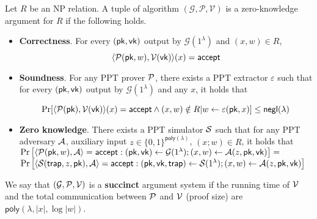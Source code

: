 \begin{definition}\label{def::zkp}
	
	Let $R$ be an NP relation. A tuple of algorithm $(\mathcal{G}, \mathcal{P}, \mathcal{V})$ is a zero-knowledge argument for $R$ if the following holds.
	
	\begin{itemize}
		
		\item \textbf{Correctness}. For every $(\pk, \vk)$ output by $\mathcal{G}(1^\lambda)$ and $(x, w) \in R$, 
		$$\langle \P(\pk, w), \V(\vk) \rangle(x) = \accept$$
		\item \textbf{Soundness}. For any PPT prover $\P$, there exists a PPT extractor $\varepsilon$ such that for every $(\pk, \vk)$ output by $\mathcal{G}(1^\lambda)$ and any $x$, it holds that
		
		$$\Pr[\langle\P(\pk), \V(\vk) \rangle(x) = \accept \wedge (x, w) \notin R | w \leftarrow \varepsilon(\pk, x)] \leq \neg(\lambda)$$
		\item \textbf{Zero knowledge}. There exists a PPT simulator $\S$ such that for any PPT adversary $\A$, auxiliary input $z \in \{0, 1\}^{\mathsf{poly}(\lambda)}$, $(x;w)\in R$, it holds that\\
		$\Pr\left[\langle\P(\pk,w),\A\rangle=\accept: (\pk,\vk)\leftarrow\mathcal{G}(1^\lambda); (x,w)\leftarrow\A(z,\pk,\vk) \right] = $\\
		$\Pr\left[\langle\S(\mathsf{trap}, z, \pk),\A\rangle=\accept:(\pk,\vk,\mathsf{trap})\leftarrow\S(1^\lambda); (x,w)\leftarrow\A(z,\pk,\vk)\right]$\\
		
	\end{itemize}
	We say that $(\mathcal{G},\P,\V)$ is a \textbf{succinct} argument system if the
	running time of $\V$ and the total communication between $\P$ and $\V$ (proof size) are $\mathsf{poly}(\lambda,|x|,\log|w|)$.
\end{definition}




